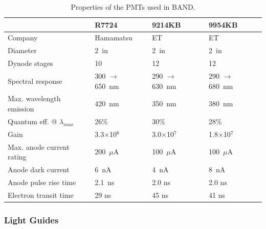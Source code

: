 \documentclass[3p,final,twocolumn]{elsarticle}
\begin{document}
\begin{table}[tbh]
\caption{Properties of the PMTs used in BAND. }
\centering
\begin{tabular} { l  l  l l } \hline
 &  R7724 \cite{pmtR7724} & 9214KB \cite{pmt9214}& 9954KB \cite{pmt9954} \\ \hline\hline
Company                                  & Hamamatsu       & ET           & ET \\
Diameter                                           & 2~in                         & 2~in                        & 2~in \\ 
Dynode stages                                  & 10                           & 12                              & 12 \\
Spectral response                            & 300 $\to$ 650~nm & 290 $\to$ 630~nm & 290 $\to$ 680~nm \\ 
Max. wavelength emission               & 420~nm & 350~nm & 380~nm \\ 
Quantum eff. @ $\lambda_{max}$   & 26\% & 30\% & 28\% \\ 
Gain                                                    & 3.3$\times$10$^6$ & 3.0$\times$10$^7$ & 1.8$\times$10$^7$ \\ 
Max. anode current rating               & 200~$\mu$A & 100~$\mu$A & 100~$\mu$A \\ 
Anode dark current                         & 6~nA  & 4~nA & 8~nA \\ 
Anode pulse rise time                      & 2.1~ns & 2.0 ns & 2.0 ns \\ 
Electron transit time                        & 29 ns & 45 ns & 41 ns \\
\hline
\end{tabular}
\label{tab:pmts}
\end{table}

\subsubsection{Light Guides}
\end{document}
